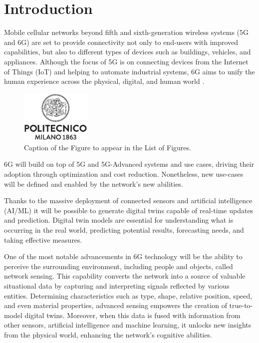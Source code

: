 \chapter{Introduction}
\label{chap_intro}

Mobile cellular networks beyond fifth and sixth-generation wireless systems (5G and 6G) are set to provide connectivity not only to end-users with improved capabilities, but also to different types of devices such as buildings, vehicles, and appliances.
Although the focus of 5G is on connecting devices from the Internet of Things (IoT) and helping to automate industrial systems, 6G aims to unify the human experience across the physical, digital, and human world \cite{6G-explained-NOKIA}.


\begin{figure}[H]
    \centering
    \includegraphics[width=0.3\textwidth]{Images/logo_polimi_scritta.eps}
    \caption{Caption of the Figure to appear in the List of Figures.}
    \label{fig:e}
\end{figure}

6G will build on top of 5G and 5G-Advanced systems and use cases, driving their adoption through optimization and cost reduction. Nonetheless, new use-cases will be defined and enabled by the network's new abilities.

Thanks to the massive deployment of connected sensors and artificial intelligence (AI/ML) it will be possible to generate digital twins capable of real-time updates and prediction.  Digital twin models are essential for understanding what is occurring in the real world, predicting potential results, forecasting needs, and taking effective measures.

One of the most notable advancements in 6G technology will be the ability to perceive the surrounding environment, including people and objects, called network sensing. This capability converts the network into a source of valuable situational data by capturing and interpreting signals reflected by various entities. Determining characteristics such as type, shape, relative position, speed, and even material properties, advanced sensing empowers the creation of true-to-model digital twins. Moreover, when this data is fused with information from other sensors, artificial intelligence and machine learning, it unlocks new insights from the physical world, enhancing the network's cognitive abilities.

